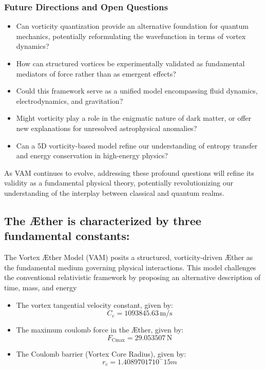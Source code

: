 \subsubsection*{Future Directions and Open Questions}
\begin{itemize}
    \item Can vorticity quantization provide an alternative foundation for quantum mechanics, potentially reformulating the wavefunction in terms of vortex dynamics?
    \item How can structured vortices be experimentally validated as fundamental mediators of force rather than as emergent effects?
    \item Could this framework serve as a unified model encompassing fluid dynamics, electrodynamics, and gravitation?
    \item Might vorticity play a role in the enigmatic nature of dark matter, or offer new explanations for unresolved astrophysical anomalies?
    \item Can a 5D vorticity-based model refine our understanding of entropy transfer and energy conservation in high-energy physics?
\end{itemize}

As VAM continues to evolve, addressing these profound questions will refine its validity as a fundamental physical theory, potentially revolutionizing our understanding of the interplay between classical and quantum realms.




\subsection{The \AE ther is characterized by three fundamental constants:}\label{subsec:the-ae-ther-is-characterized-by-three-fundamental-constants:}

The Vortex \AE ther Model (VAM) posits a structured, vorticity-driven \AE ther as the fundamental medium governing physical interactions.
This model challenges the conventional relativistic framework by proposing an alternative description of time, mass, and energy



\begin{itemize}
    \item The vortex tangential velocity constant, given by: \[C_e = 1093845.63 \, \mathrm{m/s}\]
    \item The maximum coulomb force in the \AE ther, given by:\[F_{\text{Cmax}} = 29.053507 \, \mathrm{N}\]
    \item The Coulomb barrier (Vortex Core Radius), given by: \[r_c = 1.40897017 10^-15 m\]
\end{itemize}

